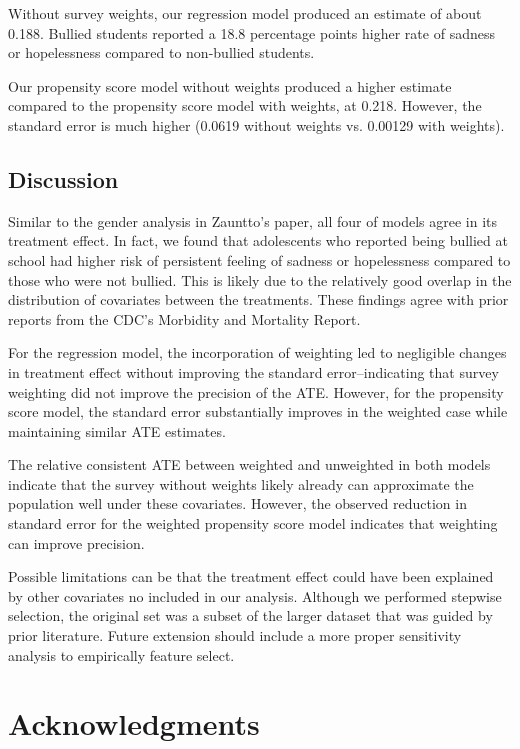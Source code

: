 \documentclass[12pt]{article}
\begin{document}
Without survey weights, our regression model produced an estimate of about 0.188. Bullied students reported a 18.8 percentage points higher rate of sadness or hopelessness compared to non-bullied students.

Our propensity score model without weights produced a higher estimate compared to the propensity score model with weights, at 0.218. However, the standard error is much higher (0.0619 without weights vs. 0.00129 with weights).


\subsection{Discussion} \label{subsec:ExtDiscuss}

Similar to the gender analysis in Zauntto's paper, all four of models agree in its treatment effect. In fact, we found that adolescents who reported being bullied at school had higher risk of persistent feeling of sadness or hopelessness compared to those who were not bullied. This is likely due to the relatively good overlap in the distribution of covariates between the treatments. These findings agree with prior reports from the CDC's Morbidity and Mortality Report. 

For the regression model, the incorporation of weighting led to negligible changes in treatment effect without improving the standard error--indicating that survey weighting did not improve the precision of the ATE. However, for the propensity score model, the standard error substantially improves in the weighted case while maintaining similar ATE estimates. 

The relative consistent ATE between weighted and unweighted in both models indicate that the survey without weights likely already can approximate the population well under these covariates. However, the observed reduction in standard error for the weighted propensity score model indicates that weighting can improve precision.

Possible limitations can be that the treatment effect could have been explained by other covariates no included in our analysis. Although we performed stepwise selection, the original set was a subset of the larger dataset that was guided by prior literature. Future extension should include a more proper sensitivity analysis to empirically feature select. 

\section{Acknowledgments}
\end{document}
